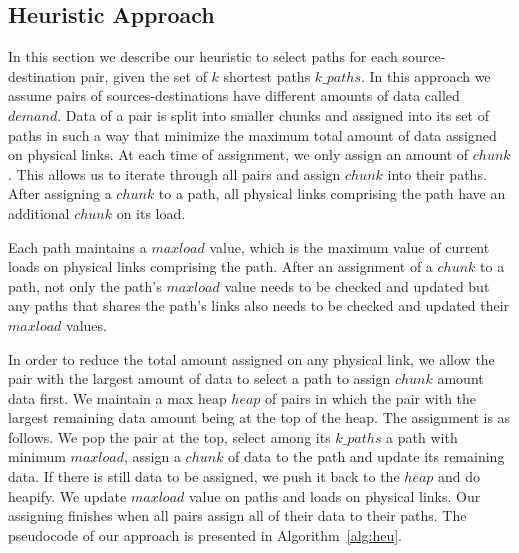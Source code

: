 \subsection{Heuristic Approach}
\label{sec:heuristic}

In this section we describe our heuristic to select paths for each source-destination pair, given the set of $k$ shortest paths $k\_paths$. In this approach we assume pairs of sources-destinations have different amounts of data called $demand$. Data of a pair is split into smaller chunks and assigned into its set of paths in such a way that minimize the maximum total amount of data assigned on physical links. At each time of assignment, we only assign an amount of $chunk$. This allows us to iterate through all pairs and assign $chunk$ into their paths. After assigning a $chunk$ to a path, all physical links comprising the path have an additional $chunk$ on its load.

Each path maintains a $maxload$ value, which is the maximum value of current loads on physical links comprising the path. After an assignment of a $chunk$ to a path, not only the path's $maxload$ value needs to be checked and updated but any paths that shares the path's links also needs to be checked and updated their $maxload$ values.

In order to reduce the total amount assigned on any physical link, we allow the pair with the largest amount of data to select a path to assign $chunk$ amount data first. We maintain a max heap $heap$ of pairs in which the pair with the largest remaining data amount being at the top of the heap. The assignment is as follows. We pop the pair at the top, select among its $k\_paths$ a path with minimum $maxload$, assign a $chunk$ of data to the path and update its remaining data. If there is still data to be assigned, we push it back to the $heap$ and do heapify. We update $maxload$ value on paths and loads on physical links. Our assigning finishes when all pairs assign all of their data to their paths. The pseudocode of our approach is presented in Algorithm~\ref{alg:heu}. 

